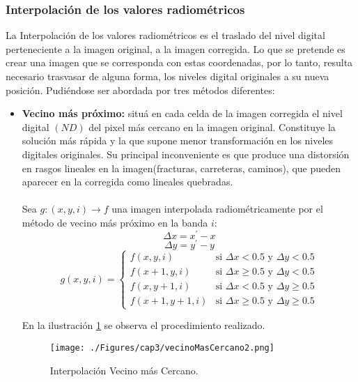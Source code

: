 \subsubsection{Interpolaci\'on de los valores radiom\'etricos}
La Interpolaci\'on de los valores radiom\'etricos es el traslado del nivel digital perteneciente a la imagen original, a la imagen corregida. Lo que se pretende es crear una imagen que se corresponda con estas coordenadas, por lo tanto, resulta necesario trasvasar de alguna forma, los niveles digital originales a su nueva posici\'on. Pudi\'endose ser abordada por tres m\'etodos diferentes:
	\begin{itemize}
		\item \textbf{Vecino m\'as pr\'oximo:} situ\'a en cada celda de la imagen corregida el nivel digital $ (ND) $ del pixel m\'as cercano en la imagen original. Constituye la soluci\'on m\'as r\'apida y la que supone menor transformaci\'on en los niveles digitales originales. Su principal inconveniente es que produce una distorsi\'on en rasgos lineales en la imagen(fracturas, carreteras, caminos), que pueden aparecer en la corregida como lineales quebradas. \\~\\
		Sea $ g:(x,y,i) \longrightarrow f$ una imagen interpolada radiom\'etricamente por el m\'etodo de vecino m\'as pr\'oximo en la banda $ i $:
		\begin{equation}
		\Delta x = x^{'}-x
		\end{equation}	
		\begin{equation}
		\Delta y = y^{'}-y
		\end{equation}	
\begin{equation}
	g(x,y,i) = \begin{cases}
		f(x,y,i) & \text{si }\Delta x < 0.5 \text{ y } \Delta y < 0.5\\
		f(x+1,y,i) & \text{si } \Delta x \geq 0.5 \text{ y } \Delta y < 0.5\\
		f(x,y+1,i) & \text{si } \Delta x < 0.5 \text{ y } \Delta y \geq 0.5\\
		f(x+1,y+1,i) & \text{si } \Delta x \geq 0.5 \text{ y } \Delta y \geq 0.5
	\end{cases}
\end{equation}	

		En la ilustraci\'on \ref{fig:vecinoMasCercano2} se observa el procedimiento realizado.
				    \begin{figure}[H]
				    	\centering
				    	\texttt{[image: ./Figures/cap3/vecinoMasCercano2.png]}
				    	\caption{Interpolaci\'on Vecino m\'as Cercano.}
				    	\label{fig:vecinoMasCercano2}
				    \end{figure}
		

\end{itemize}
